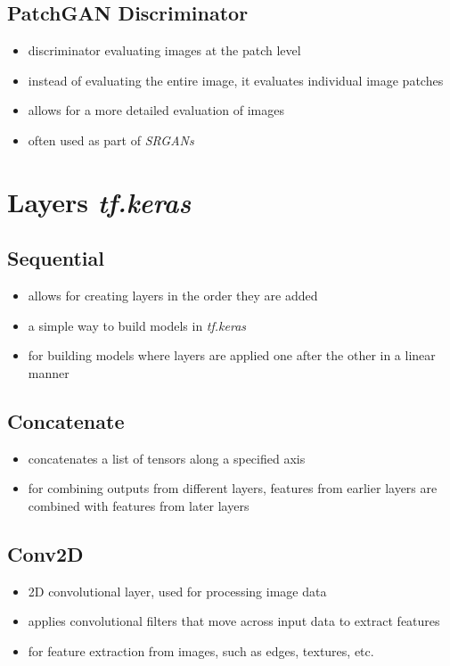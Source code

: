 \documentclass{article}
\begin{document}
\subsection{PatchGAN Discriminator}
\begin{itemize}
    \item discriminator evaluating images at the patch level
    \item instead of evaluating the entire image, it evaluates individual image patches
    \item allows for a more detailed evaluation of images
    \item often used as part of \textit{SRGANs}
\end{itemize}
\newpage

\section{Layers \textit{tf.keras}}
\subsection{Sequential}
\begin{itemize}
    \item allows for creating layers in the order they are added
    \item a simple way to build models in \textit{tf.keras}
    \item for building models where layers are applied one after the other in a linear manner
\end{itemize}

\subsection{Concatenate}
\begin{itemize}
    \item concatenates a list of tensors along a specified axis
    \item for combining outputs from different layers, features from earlier layers are combined with features from later layers
\end{itemize}

\subsection{Conv2D}
\begin{itemize}
    \item 2D convolutional layer, used for processing image data
    \item applies convolutional filters that move across input data to extract features
    \item for feature extraction from images, such as edges, textures, etc.
\end{itemize}
\end{document}
